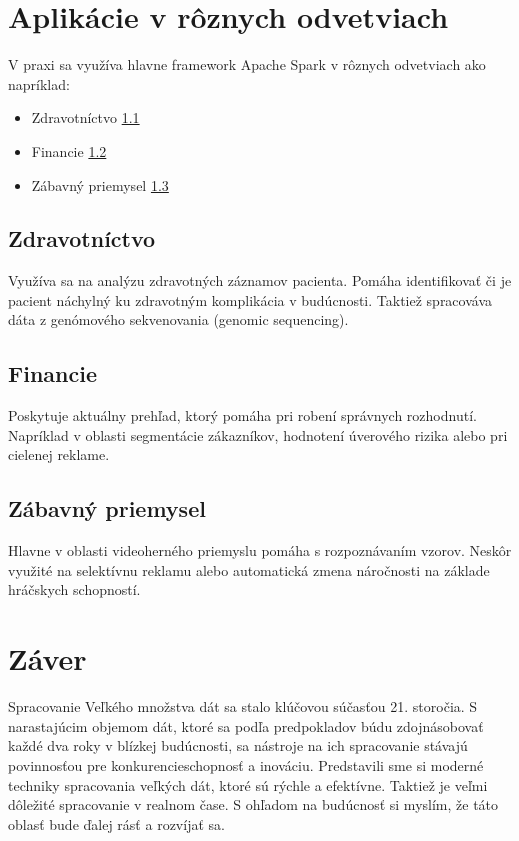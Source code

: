 \documentclass[10pt,twoside,slovak,a4paper]{article}
\begin{document}
\section {Aplikácie v rôznych odvetviach} \label {Aplikacie}

V praxi sa využíva hlavne framework Apache Spark v rôznych odvetviach ako napríklad:
\begin{itemize}
\item Zdravotníctvo \ref{Zdrav}
\item Financie \ref {Fin}
\item Zábavný priemysel \ref {Zabav}
\end{itemize}

\subsection {Zdravotníctvo} \label {Zdrav}

Využíva sa na analýzu zdravotných záznamov pacienta. Pomáha identifikovať či je pacient náchylný ku zdravotným komplikácia v budúcnosti. Taktiež spracováva dáta z genómového sekvenovania (genomic sequencing).

\subsection {Financie} \label {Fin}

Poskytuje aktuálny prehľad, ktorý pomáha pri robení správnych rozhodnutí. Napríklad v oblasti segmentácie zákazníkov, hodnotení úverového rizika alebo pri cielenej reklame.

\subsection {Zábavný priemysel} \label {Zabav}

Hlavne v oblasti videoherného priemyslu pomáha s rozpoznávaním vzorov. Neskôr využité na selektívnu reklamu alebo automatická zmena náročnosti na základe hráčskych schopností.

\cite {ApacheAplication}

\section{Záver} \label{zaver} %
Spracovanie Veľkého množstva dát sa stalo klúčovou súčasťou 21. storočia. S narastajúcim objemom dát, ktoré sa podľa predpokladov búdu zdojnásobovať každé dva roky v blízkej budúcnosti\cite{Survey}, sa nástroje na ich spracovanie stávajú povinnosťou pre konkurencieschopnosť a inováciu. Predstavili sme si moderné techniky spracovania veľkých dát, ktoré sú rýchle a efektívne. Taktiež je veľmi dôležité spracovanie v realnom čase. S ohľadom na budúcnosť si myslím, že táto oblasť bude ďalej rásť a rozvíjať sa.





\end{document}
